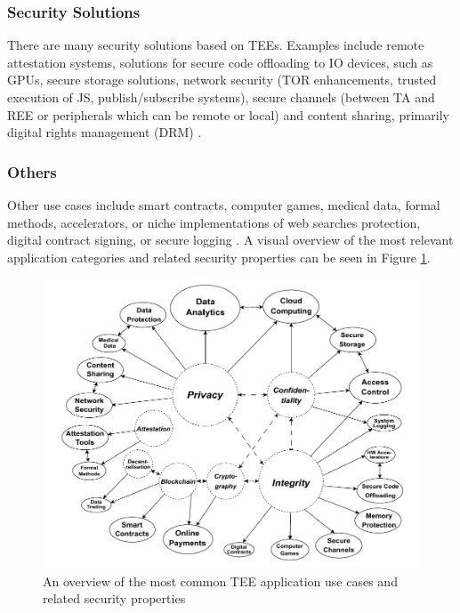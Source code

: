 \documentclass[runningheads,a4paper]{uwsese}
\begin{document}
\subsubsection{Security Solutions}

There are many security solutions based on TEEs. Examples include remote
attestation systems, solutions for secure code offloading to IO devices, such
as GPUs, secure storage solutions, network security (TOR enhancements, trusted
execution of JS, publish/subscribe systems), secure channels (between TA and
REE or peripherals which can be remote or local) and content sharing, primarily
digital rights management (DRM) \cite{tee_app_rev}.

\subsubsection{Others}

Other use cases include smart contracts, computer games, medical data, formal
methods, accelerators, or niche implementations of web searches protection, 
digital contract signing, or secure logging \cite{tee_app_rev}. A visual overview
of the most relevant application categories and related security properties can be
seen in Figure \ref{fig:tee_apps}.

\begin{figure}[h]
    \centering
    \includegraphics[scale=.3]{tee_apps.png}
    \caption{An overview of the most common TEE application use cases and
        related security properties \cite{tee_app_rev}}
    \label{fig:tee_apps}
\end{figure}
\end{document}

